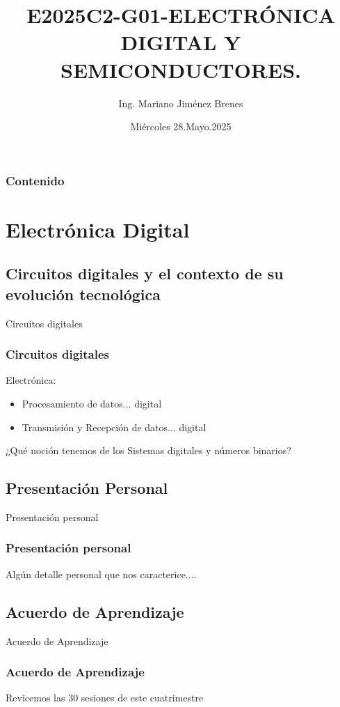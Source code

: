 \documentclass[11pt]{beamer}
\author{Ing. Mariano Jim\'enez Brenes}
\title
{
E2025C2-G01-ELECTRÓNICA DIGITAL Y SEMICONDUCTORES.
}
\institute{
Universidad Castro Carazo\linebreak
T\'ecnico En Semiconductores
}
\date{Mi\'ercoles 28.Mayo.2025}
\begin{document}
\begin{frame}
\maketitle 
\end{frame}

\logo{}

\begin{frame}
\frametitle{Contenido}
\tableofcontents
\end{frame}


\section{Electr\'onica Digital}
\subsection{Circuitos digitales y el
contexto de su evoluci\'on
tecnol\'ogica}
\begin{frame}{Circuitos digitales}
\frametitle{Circuitos digitales}
Electr\'onica:
	\begin{itemize}
		\item Procesamiento de datos... digital
		\item Transmisi\'on y Recepci\'on de datos... digital
	\end{itemize}
	¿Qu\'e noci\'on tenemos de los Sistemas digitales y n\'umeros binarios?
\end{frame}
\subsection{Presentaci\'on Personal}
\begin{frame}{Presentaci\'on personal}
\frametitle{Presentaci\'on personal}
Alg\'un detalle personal que nos caracterice....
\end{frame}
\subsection{Acuerdo de Aprendizaje}
\begin{frame}{Acuerdo de Aprendizaje}
\frametitle{Acuerdo de Aprendizaje}
Revicemos las 30 sesiones de este cuatrimestre
\end{frame}
\end{document}
